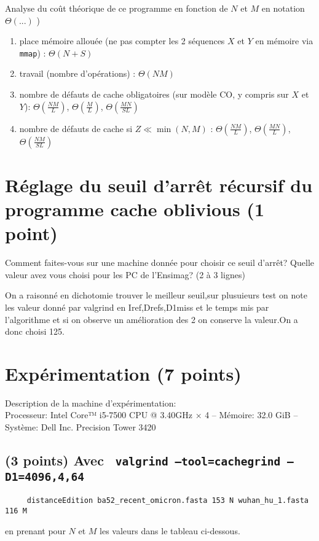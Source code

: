\documentclass[10pt,a4paper]{article}
\begin{document}
\medskip

Analyse du coût théorique de ce  programme en fonction de $N$ et $M$  en notation $\Theta(...)$ )
\begin{enumerate}
  \item place mémoire allouée (ne pas compter les 2 séquences $X$ et $Y$ en mémoire via {\tt mmap}) : $\Theta(N + S)$
  \item travail (nombre d'opérations) : $\Theta(NM)$
  \item nombre de défauts de cache obligatoires (sur modèle CO, y compris sur $X$ et $Y$): $\Theta \left( \frac{NM}{L} \right)$, $\Theta \left( \frac{M}{L} \right)$, $\Theta \left( \frac{MN}{SL} \right)$
  \item nombre de défauts de cache si $Z \ll \min(N,M)$ : $\Theta \left( \frac{NM}{L} \right)$, $\Theta \left( \frac{MN}{L} \right)$, $\Theta \left( \frac{NM}{SL} \right)$
\end{enumerate}

\section{Réglage du seuil d'arrêt récursif du programme cache oblivious  (1 point)} 
Comment faites-vous sur une machine donnée pour choisir ce seuil d'arrêt? Quelle valeur avez vous choisi pour les
PC de l'Ensimag? (2 à 3 lignes)

On a raisonné en dichotomie trouver le meilleur seuil,sur plusuieurs test on note les valeur donné par valgrind en Iref,Drefs,D1miss et le temps mis par l'algorithme et si on observe un amélioration des 2 on conserve la valeur.On a donc choisi 125.
\section{Expérimentation (7 points)}

Description de la machine d'expérimentation:  \\
Processeur: Intel Core™ i5-7500 CPU @ 3.40GHz × 4 --
Mémoire: 32.0 GiB --
Système: Dell Inc. Precision Tower 3420

\subsection{(3 points) Avec {\tt 
	valgrind --tool=cachegrind --D1=4096,4,64
}} 
\begin{verbatim}
     distanceEdition ba52_recent_omicron.fasta 153 N wuhan_hu_1.fasta 116 M 
\end{verbatim}
en prenant pour $N$ et $M$ les valeurs dans le tableau ci-dessous.
\end{document}
